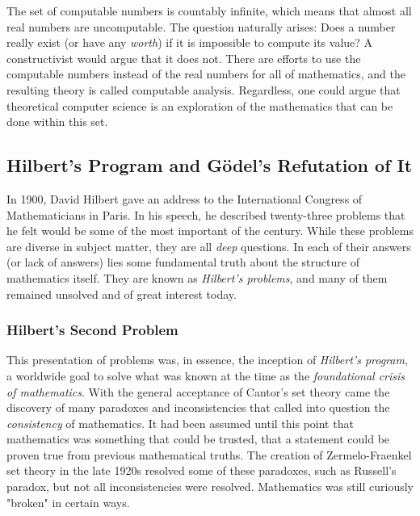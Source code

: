 The set of computable numbers is countably infinite, which means that almost all real numbers are uncomputable. The question naturally arises: Does a number really exist (or have any \textit{worth}) if it is impossible to compute its value? A constructivist would argue that it does not. There are efforts to use the computable numbers instead of the real numbers for all of mathematics, and the resulting theory is called computable analysis. Regardless, one could argue that theoretical computer science is an exploration of the mathematics that can be done within this set. \\



\subsection{Hilbert's Program and G\"odel's Refutation of It}

In 1900, David Hilbert gave an address to the International Congress of Mathematicians in Paris. In his speech, he described twenty-three problems that he felt would be some of the most important of the century. While these problems are diverse in subject matter, they are all \textit{deep} questions. In each of their answers (or lack of answers) lies some fundamental truth about the structure of mathematics itself. They are known as \textit{Hilbert's problems}, and many of them remained unsolved and of great interest today. \\

\subsubsection{Hilbert's Second Problem}

This presentation of problems was, in essence, the inception of \textit{Hilbert's program}, a worldwide goal to solve what was known at the time as the \textit{foundational crisis of mathematics}. With the general acceptance of Cantor's set theory came the discovery of many paradoxes and inconsistencies that called into question the \textit{consistency} of mathematics. It had been assumed until this point that mathematics was something that could be trusted, that a statement could be proven true from previous mathematical truths. The creation of Zermelo-Fraenkel set theory in the late 1920s resolved some of these paradoxes, such as Russell's paradox, but not all inconsistencies were resolved. Mathematics was still curiously "broken" in certain ways. \\

